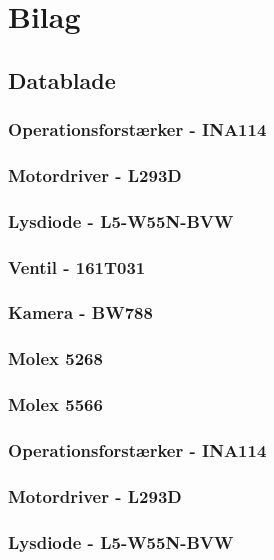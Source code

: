 \chapter{Bilag}
\section{Datablade}
\subsection{Operationsforstærker - INA114}
\label{bilag:INA114}

\subsection{Motordriver - L293D}
\label{bilag:L293D}

\subsection{Lysdiode - L5-W55N-BVW}
\label{bilag:L5-W55N-BVW}

\subsection{Ventil - 161T031}
\label{bilag:ventil}


\subsection{Kamera - BW788}

\subsection{Molex 5268}

\subsection{Molex 5566}\subsection{Operationsforstærker - INA114}
\label{bilag:INA114}

\subsection{Motordriver - L293D}
\label{bilag:L293D}

\subsection{Lysdiode - L5-W55N-BVW}
\label{bilag:L5-W55N-BVW}

